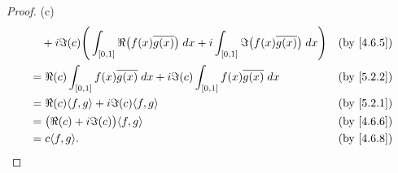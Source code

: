 \begin{proof}{(c)}
\begin{align*}
     & \quad + i \Im(c) \Bigg(\int_{[0, 1]} \Re\big(f(x) \overline{g(x)}\big) \; dx + i \int_{[0, 1]} \Im\big(f(x) \overline{g(x)}\big) \; dx\Bigg) & \text{(by \cref{4.6.5})}             \\
     & = \Re(c) \int_{[0, 1]} f(x) \overline{g(x)} \; dx + i \Im(c) \int_{[0, 1]} f(x) \overline{g(x)} \; dx                                        & \text{(by \cref{5.2.2})}             \\
     & = \Re(c) \inner*{f, g} + i \Im(c) \inner*{f, g}                                                                                              & \text{(by \cref{5.2.1})}             \\
     & = \big(\Re(c) + i \Im(c)\big) \inner*{f, g}                                                                                                  & \text{(by \cref{4.6.6})}             \\
     & = c \inner*{f, g}.                                                                                                                           & \text{(by \cref{4.6.8})}
  \end{align*}
\end{proof}

